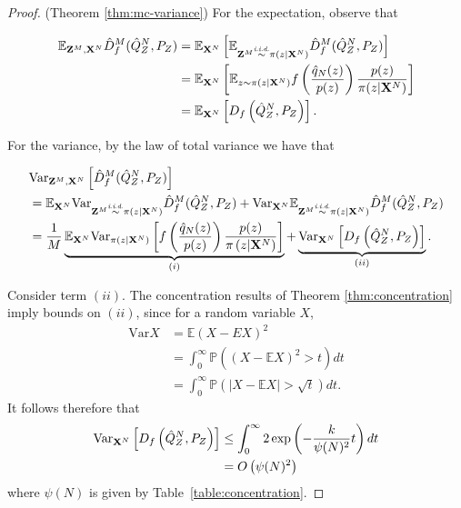 \begin{proof}(Theorem \ref{thm:mc-variance})
For the expectation, observe that

\begin{align*}
    \mathbb{E}_{\mathbf{Z}^M, \mathbf{X}^N} \hat{D}^M_f( \hat{Q}_Z^N , P_Z)
    &=\mathbb{E}_{\mathbf{X}^N} \left[ \mathbb{E}_{\mathbf{Z}^M \overset{\text{\emph{i.i.d.}}}{\sim} \pi(z | \mathbf{X}^N)} \hat{D}^M_f( \hat{Q}_Z^N , P_Z)\right] \\
    &= \mathbb{E}_{\mathbf{X}^N} \left[ \mathbb{E}_{z \sim \pi(z | \mathbf{X}^N)} f\left(\frac{\hat{q}_N(z)}{p(z)} \right) \frac{p(z)}{\pi(z|\mathbf{X}^N)} \right] \\
    &=\mathbb{E}_{\mathbf{X}^N} \left[ D_f\left( \hat{Q}^N_Z , P_Z \right)\right].
\end{align*}

For the variance, by the law of total variance we have that

\begin{align*}
    &\text{Var}_{\mathbf{Z}^M, \mathbf{X}^N} \left[\hat{D}^M_f( \hat{Q}_Z^N , P_Z)  \right]  \\
    &= \mathbb{E}_{\mathbf{X}^N} \text{Var}_{\mathbf{Z}^M \overset{\text{\emph{i.i.d.}}}{\sim} \pi(z|\mathbf{X}^N)} \hat{D}^M_f( \hat{Q}_Z^N , P_Z) + \text{Var}_{\mathbf{X}^N} \mathbb{E}_{\mathbf{Z}^M \overset{\text{\emph{i.i.d.}}}{\sim} \pi(z|\mathbf{X}^N)} \hat{D}^M_f( \hat{Q}_Z^N , P_Z)
    \\
    &=\frac{1}{M} \underbrace{\mathbb{E}_{\mathbf{X}^N} \text{Var}_{\pi(z|\mathbf{X}^N)} \left[ f\left( \frac{\hat{q}_N(z)}{p(z)} \right) \frac{p(z)}{\pi\left(z|\mathbf{X}^N\right)} \right]}_{(i)}  + \underbrace{\text{Var}_{\mathbf{X}^N} \left[D_f\left( \hat{Q}^N_Z , P_Z \right)\right]}_{(ii)}.
\end{align*}

Consider term $(ii)$.
The concentration results of Theorem \ref{thm:concentration} imply bounds on $(ii)$, since for a random variable $X$,
\begin{align*}
    \text{Var}X &= \mathbb{E} (X - EX)^2 \\
    &= \int_0^\infty \mathbb{P}\left( (X - \mathbb{E} X)^2 > t \right) dt \\
    &= \int_0^\infty \mathbb{P} \left( \left| X - \mathbb{E} X \right| > \sqrt{t} \right) dt.
\end{align*}
It follows therefore that
\begin{align*}
    \text{Var}_{\mathbf{X}^N} \left[D_f\left( \hat{Q}^N_Z , P_Z \right)\right] 
    &\leq \int_0^\infty 2 \exp\left( -\frac{k}{\psi(N)^2}t \right) dt\\
    &= O\left(\psi(N)^2 \right)
\end{align*}
where $\psi(N)$ is given by Table~\ref{table:concentration}.


\end{proof}
